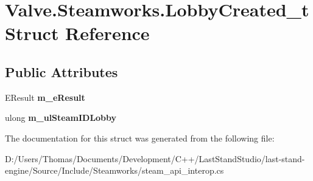 \hypertarget{structValve_1_1Steamworks_1_1LobbyCreated__t}{}\section{Valve.\+Steamworks.\+Lobby\+Created\+\_\+t Struct Reference}
\label{structValve_1_1Steamworks_1_1LobbyCreated__t}
\subsection*{Public Attributes}
\begin{DoxyCompactItemize}
\item 
\hypertarget{structValve_1_1Steamworks_1_1LobbyCreated__t_a61cd7d6b0a9fc69a263a5a5dcee4268e}{}E\+Result {\bfseries m\+\_\+e\+Result}\label{structValve_1_1Steamworks_1_1LobbyCreated__t_a61cd7d6b0a9fc69a263a5a5dcee4268e}

\item 
\hypertarget{structValve_1_1Steamworks_1_1LobbyCreated__t_a7f0ffbf3f04557ddf43c22668ea047b1}{}ulong {\bfseries m\+\_\+ul\+Steam\+I\+D\+Lobby}\label{structValve_1_1Steamworks_1_1LobbyCreated__t_a7f0ffbf3f04557ddf43c22668ea047b1}

\end{DoxyCompactItemize}


The documentation for this struct was generated from the following file\+:\begin{DoxyCompactItemize}
\item 
D\+:/\+Users/\+Thomas/\+Documents/\+Development/\+C++/\+Last\+Stand\+Studio/last-\/stand-\/engine/\+Source/\+Include/\+Steamworks/steam\+\_\+api\+\_\+interop.\+cs\end{DoxyCompactItemize}
